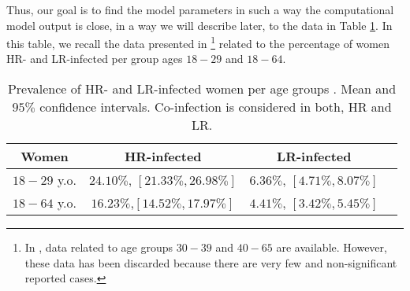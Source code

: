 Thus, our goal is to find the model parameters in such a way the computational model output is close, in a way we will describe later, to the data in Table \ref{datos}. In this table, we recall the data presented in \cite{castellsague2012prevalence}\footnote{In \cite{castellsague2012prevalence}, data related to age groups $30-39$ and $40-65$ are available. However, these data has been discarded because there are very few and non-significant reported cases.} related to the percentage of women HR- and LR-infected per group ages $18-29$ and $18-64$. \\

\begin{table}[h]
	\centering
	\begin{tabular}{c|ccc}
		Women & HR-infected & LR-infected \\
		\hline
		$18-29$ y.o. & $24.10\%$, $[21.33\%, 26.98\%]$ & $6.36\%$, $[4.71\%, 8.07\%]$ \\
		$18-64$ y.o. & $16.23\%$,$[14.52\%, 17.97\%]$ & $4.41\%$, $[3.42\%, 5.45\%]$ \\
	\end{tabular}
	\caption{Prevalence of HR- and LR-infected women per age groups \cite{castellsague2012prevalence}. Mean and $95\%$ confidence intervals. Co-infection is considered in both, HR and LR.}
	\label{datos}
\end{table}
